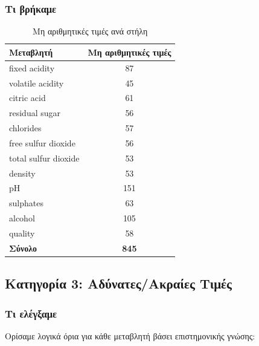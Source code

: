 \documentclass[12pt,a4paper]{article}
\begin{document}
\subsubsection{\textgreek{Τι βρήκαμε}}

\begin{table}[H]
\centering
\caption{\textgreek{Μη αριθμητικές τιμές ανά στήλη}}
\label{tab:non_numeric}
\begin{tabular}{@{}lc@{}}
\toprule
\textbf{\textgreek{Μεταβλητή}} & \textbf{\textgreek{Μη αριθμητικές τιμές}} \\
\midrule
fixed acidity & 87 \\
volatile acidity & 45 \\
citric acid & 61 \\
residual sugar & 56 \\
chlorides & 57 \\
free sulfur dioxide & 56 \\
total sulfur dioxide & 53 \\
density & 53 \\
pH & 151 \\
sulphates & 63 \\
alcohol & 105 \\
quality & 58 \\
\midrule
\textbf{\textgreek{Σύνολο}} & \textbf{845} \\
\bottomrule
\end{tabular}
\end{table}

\subsection{\textgreek{Κατηγορία 3: Αδύνατες/Ακραίες Τιμές}}

\subsubsection{\textgreek{Τι ελέγξαμε}}

\textgreek{Ορίσαμε λογικά όρια για κάθε μεταβλητή βάσει επιστημονικής γνώσης:}
\end{document}
